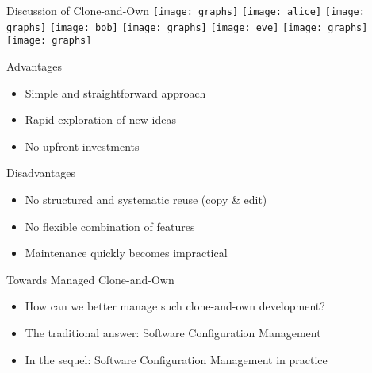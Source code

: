 \begin{frame}{Discussion of Clone-and-Own}
	\texttt{[image: graphs]}
	\hfill
	\texttt{[image: alice]}%
	\texttt{[image: graphs]}
	\hfill
	\texttt{[image: bob]}%
	\texttt{[image: graphs]}
	\hfill
	\texttt{[image: eve]}%
	\texttt{[image: graphs]}
	\hfill
	\texttt{[image: graphs]}

	\begin{mycolumns}[columns=2,widths={45,55},animation=none]
		\begin{note}{Advantages}
			\begin{itemize}
				\item Simple and straightforward approach
				\item Rapid exploration of new ideas
				\item No upfront investments
			\end{itemize}
		\end{note}
	\mynextcolumn
		\begin{note}{Disadvantages}
			\begin{itemize}
				\item No structured and systematic reuse (copy \& edit)
				\item No flexible combination of features
				\item Maintenance quickly becomes impractical
			\end{itemize}
		\end{note}
	\end{mycolumns}	
	\begin{mycolumns}[columns=3,widths={15,70}]
	\mynextcolumn
		\begin{note}{Towards Managed Clone-and-Own}
			\begin{itemize}
				\item How can we better manage such clone-and-own development?
				\item The traditional answer: Software Configuration Management
				\item In the sequel: Software Configuration Management in practice
			\end{itemize}
		\end{note}
	\mynextcolumn
	\end{mycolumns}
\end{frame}


